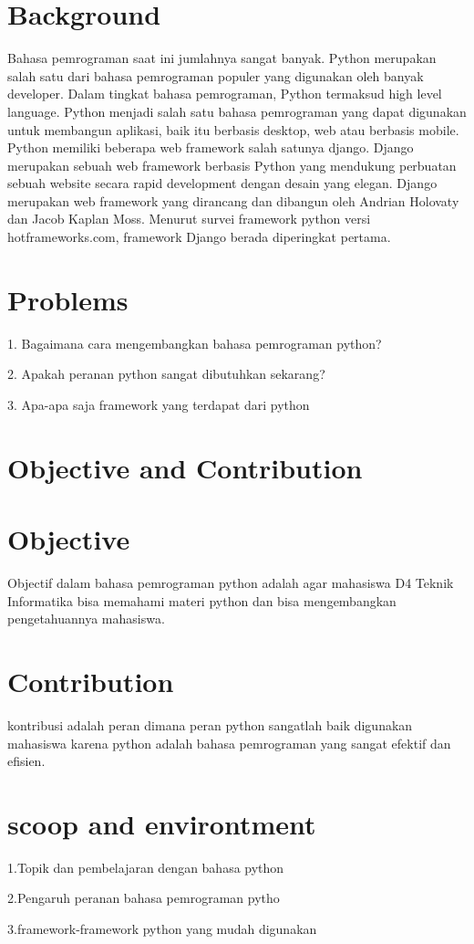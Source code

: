 
\section{Background}
Bahasa pemrograman saat ini jumlahnya sangat banyak. Python merupakan salah satu dari bahasa pemrograman populer yang digunakan oleh banyak developer. Dalam tingkat bahasa pemrograman, Python termaksud high level language. Python menjadi salah satu bahasa pemrograman yang dapat digunakan untuk membangun aplikasi, baik itu berbasis desktop, web atau berbasis mobile. 
Python memiliki beberapa web framework salah satunya django. Django merupakan sebuah web framework berbasis Python yang mendukung perbuatan sebuah website secara rapid development dengan desain yang elegan. Django merupakan web framework yang dirancang dan dibangun oleh Andrian Holovaty dan Jacob Kaplan Moss. Menurut survei framework python versi  hotframeworks.com, framework Django berada diperingkat pertama.



\section{Problems}

1. Bagaimana cara mengembangkan bahasa pemrograman python?

2. Apakah peranan python sangat dibutuhkan sekarang?

3. Apa-apa saja framework yang terdapat dari python \citep{adams1995hitchhiker}



\section{Objective and Contribution}


\section{Objective}
Objectif dalam bahasa pemrograman python adalah agar mahasiswa D4 Teknik Informatika bisa memahami materi python dan bisa mengembangkan pengetahuannya mahasiswa.




\section{Contribution}
kontribusi adalah peran dimana peran python sangatlah baik digunakan mahasiswa karena python adalah bahasa pemrograman yang sangat efektif dan efisien.



\section{scoop and environtment}

1.Topik dan pembelajaran dengan bahasa python 

2.Pengaruh peranan bahasa pemrograman pytho

3.framework-framework python yang mudah digunakan


